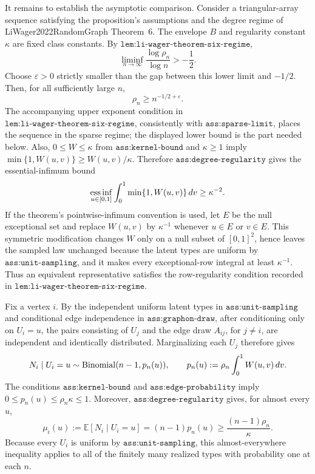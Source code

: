 It remains to establish the asymptotic comparison.  Consider a triangular-array sequence satisfying the proposition's assumptions and the degree regime of LiWager2022RandomGraph Theorem~6.  The envelope \(B\) and regularity constant \(\kappa\) are fixed class constants.  By \(\texttt{lem:li-wager-theorem-six-regime}\),
\[
\liminf_{n\to\infty}\frac{\log\rho_n}{\log n}>-\frac12.
\]
Choose \(\varepsilon>0\) strictly smaller than the gap between this lower limit and \(-1/2\).  Then, for all sufficiently large \(n\),
\[
\rho_n\ge n^{-1/2+\varepsilon}.
\]
The accompanying upper exponent condition in \(\texttt{lem:li-wager-theorem-six-regime}\), consistently with \(\texttt{ass:sparse-limit}\), places the sequence in the sparse regime; the displayed lower bound is the part needed below.
Also, \(0\le W\le\kappa\) from \(\texttt{ass:kernel-bound}\) and \(\kappa\ge1\) imply \(\min\{1,W(u,v)\}\ge W(u,v)/\kappa\).  Therefore \(\texttt{ass:degree-regularity}\) gives the essential-infimum bound
\[
\mathop{\rm ess\,inf}_{u\in[0,1]}\int_0^1\min\{1,W(u,v)\}\,dv\ge\kappa^{-2}.
\]
If the theorem's pointwise-infimum convention is used, let \(E\) be the null exceptional set and replace \(W(u,v)\) by \(\kappa^{-1}\) whenever \(u\in E\) or \(v\in E\).  This symmetric modification changes \(W\) only on a null subset of \([0,1]^2\), hence leaves the sampled law unchanged because the latent types are uniform by \(\texttt{ass:unit-sampling}\), and it makes every exceptional-row integral at least \(\kappa^{-1}\).  Thus an equivalent representative satisfies the row-regularity condition recorded in \(\texttt{lem:li-wager-theorem-six-regime}\).

Fix a vertex \(i\).  By the independent uniform latent types in \(\texttt{ass:unit-sampling}\) and conditional edge independence in \(\texttt{ass:graphon-draw}\), after conditioning only on \(U_i=u\), the pairs consisting of \(U_j\) and the edge draw \(A_{ij}\), for \(j\ne i\), are independent and identically distributed.  Marginalizing each \(U_j\) therefore gives
\[
N_i\mid U_i=u\sim {\rm Binomial}(n-1,p_n(u)),
\qquad
p_n(u):=\rho_n\int_0^1W(u,v)\,dv.
\]
The conditions \(\texttt{ass:kernel-bound}\) and \(\texttt{ass:edge-probability}\) imply \(0\le p_n(u)\le\rho_n\kappa\le1\).  Moreover, \(\texttt{ass:degree-regularity}\) gives, for almost every \(u\),
\[
\mu_i(u):=\mathbb E[N_i\mid U_i=u]
=(n-1)p_n(u)
\ge\frac{(n-1)\rho_n}{\kappa}.
\]
Because every \(U_i\) is uniform by \(\texttt{ass:unit-sampling}\), this almost-everywhere inequality applies to all of the finitely many realized types with probability one at each \(n\).

